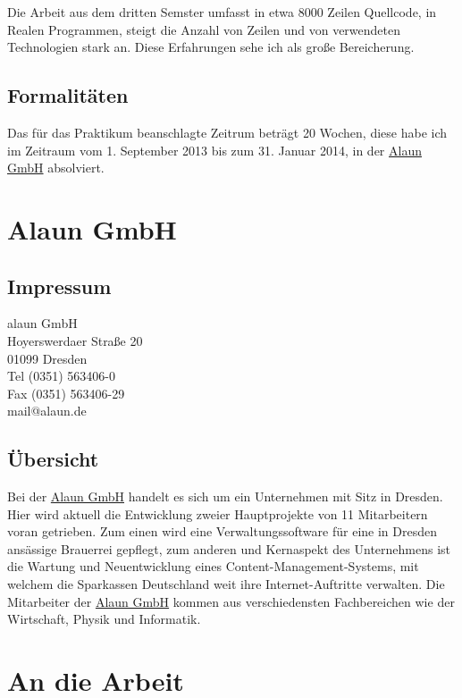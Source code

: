 \documentclass{scrartcl}
\begin{document}
Die Arbeit aus dem dritten Semster umfasst in etwa 8000 Zeilen Quellcode, in Realen Programmen, steigt die
Anzahl von Zeilen und von verwendeten Technologien stark an. Diese Erfahrungen sehe ich als große Bereicherung.


\subsection{Formalitäten}

Das für das Praktikum beanschlagte Zeitrum beträgt 20 Wochen, diese habe ich im Zeitraum vom 1. September 2013
bis zum 31. Januar 2014, in der \href{https://alaun.de/home/}{Alaun GmbH} absolviert.

\section{Alaun GmbH}

\subsection{Impressum}

alaun GmbH \\
Hoyerswerdaer Straße 20 \\
01099 Dresden \\

Tel (0351) 563406-0  \\
Fax (0351) 563406-29 \\

mail@alaun.de 

\subsection{Übersicht}

Bei der \href{https://alaun.de/home/}{Alaun GmbH} handelt es sich um ein Unternehmen mit Sitz in Dresden.
Hier wird aktuell die Entwicklung zweier Hauptprojekte von 11 Mitarbeitern voran getrieben.
Zum einen wird eine Verwaltungssoftware für eine in Dresden ansässige Brauerrei gepflegt,
zum anderen und Kernaspekt des Unternehmens ist die Wartung und Neuentwicklung eines Content-Management-Systems,
mit welchem die Sparkassen Deutschland weit ihre Internet-Auftritte verwalten.
Die Mitarbeiter der \href{https://alaun.de/home/}{Alaun GmbH} kommen aus verschiedensten Fachbereichen wie der Wirtschaft,
Physik und Informatik. 

\newpage

\section{An die Arbeit}
\end{document}
